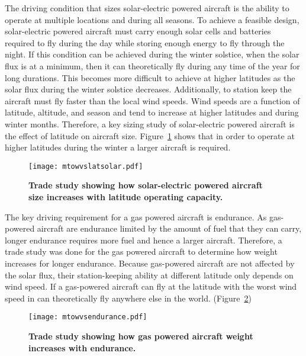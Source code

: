 \documentclass[]{aiaa-tc}%
\begin{document}
The driving condition that sizes solar-electric powered aircraft is the ability to operate at multiple locations and during all seasons.  
To achieve a feasible design, solar-electric powered aircraft must carry enough solar cells and batteries required to fly during the day while storing enough energy to fly through the night.\cite{solartech}
If this condition can be achieved during the winter solstice, when the solar flux is at a minimum, then it can theoretically fly during any time of the year for long durations. \cite{solartech}
This becomes more difficult to achieve at higher latitudes as the solar flux during the winter solstice decreases.  
Additionally, to station keep the aircraft must fly faster than the local wind speeds.  
Wind speeds are a function of latitude, altitude, and season and tend to increase at higher latitudes and during winter months. 
Therefore, a key sizing study of solar-electric powered aircraft is the effect of latitude on aircraft size.  
Figure~\ref{f:solarstart} shows that in order to operate at higher latitudes during the winter a larger aircraft is required. 

\begin{figure}[H]
	\begin{center}
	\texttt{[image: mtowvslatsolar.pdf]}
    \caption{ \textbf{ Trade study showing how solar-electric powered aircraft size increases with latitude operating capacity.  }}
	\label{f:solarstart}
	\end{center}
\end{figure}

The key driving requirement for a gas powered aircraft is endurance.  
As gas-powered aircraft are endurance limited by the amount of fuel that they can carry, longer endurance requires more fuel and hence a larger aircraft.  
Therefore, a trade study was done for the gas powered aircraft to determine how weight increases for longer endurance.
Because gas-powered aircraft are not affected by the solar flux, their station-keeping ability at different latitude only depends on wind speed. 
If a gas-powered aircraft can fly at the latitude with the worst wind speed in can theoretically fly anywhere else in the world.  
 (Figure~\ref{f:mtowvsendurance}) 

\begin{figure}[H]
	\begin{center}
	\texttt{[image: mtowvsendurance.pdf]}
    \caption{\textbf{Trade study showing how gas powered aircraft weight increases with endurance.}}
	\label{f:mtowvsendurance}
	\end{center}
\end{figure}
\end{document}
